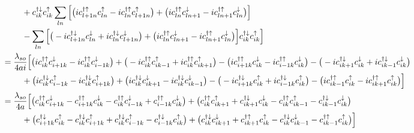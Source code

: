 \documentclass[10pt,prb,showpacs,amssymb,floatfix]{revtex4-1}
\newcommand{\dg}{\dagger}
\newcommand{\dna}{\downarrow}
\newcommand{\nn}{\nonumber}
\newcommand{\upa}{\uparrow}
\begin{document}
\begin{align}
& ~~~~~~~ + c_{ik}^{\dg\dna} c_{ik}^{\upa}  \sum_{ln}  \Big{[} \big{(}i c_{l+1n}^{\dagger \uparrow} c_{l n}^\uparrow - i c_{l n}^{\dagger \uparrow} c_{l+1 n}^\uparrow   \big{)} +  \big{(} i c_{l n}^{\dagger \upa}  c_{l n+1}^\dna  - i c_{ln+1}^{\dagger \uparrow}  c_{ln}^\downarrow \big{)}  \Big{]} \nn\\
& ~~~~~~~  - \sum_{ln}  \Big{[} \big{(} - i c_{l+1n}^{\dagger \downarrow} c_{ln}^\downarrow  + i c_{ln}^{\dagger \downarrow} c_{l+1n}^\downarrow \big{)} +  \big{(} i c_{l n}^{\dagger \upa}  c_{l n+1}^\dna  - i c_{ln+1}^{\dagger \uparrow}  c_{ln}^\downarrow \big{)}  \Big{]} c_{ik}^{\dg\dna} c_{ik}^{\upa}   \Big{]} \nn\\
&= \frac{\lambda_{so}}{4ai} \Big{[}       \big{(}   i c_{ik}^{\dg\upa} c_{i+1k}^\downarrow  - i c_{ik}^{\dg\upa}  c_{i-1 k}^\downarrow \big{)} +  \big{(} -i   c_{ik}^{\dg\upa} c_{i k-1}^\uparrow  + i c_{ik}^{\dg\upa}  c_{i k+1}^\upa \big{)} 
 -  \big{(}i c_{i+1k}^{\dagger \uparrow} c_{i k}^\dna - i c_{i-1 k}^{\dagger \uparrow} c_{i k}^\dna   \big{)} -  \big{(} -i c_{i k+1}^{\dagger \downarrow} c_{i k}^\dna  + i c_{i k-1}^{\dagger \dna}  c_{ik}^\dna  \big{)}  \nn\\
& ~~~~~~~ +   \big{(}i c_{ik}^{\dg\dna}  c_{i-1 k}^\uparrow - i c_{ik}^{\dg\dna} c_{i+1 k}^\uparrow   \big{)} +  \big{(} i c_{ik}^{\dg\dna} c_{i k+1}^\dna  - i  c_{ik}^{\dg\dna} c_{ik-1}^\downarrow \big{)}   -  \big{(} - i c_{i+1k}^{\dagger \downarrow} c_{ik}^\upa  + i c_{i-1 k}^{\dagger \downarrow} c_{ik}^\upa \big{)} -  \big{(} i c_{i k-1}^{\dagger \upa}  c_{ik}^\upa  - i c_{ik+1}^{\dagger \uparrow}  c_{ik}^\upa \big{)}  \Big{]}  \nn\\
&=  \frac{\lambda_{so}}{4a} \Big{[}       \big{(}    c_{ik}^{\dg\upa} c_{i+1k}^\downarrow -  c_{i+1k}^{\dagger \uparrow} c_{i k}^\dna  -  c_{ik}^{\dg\upa}  c_{i-1 k}^\downarrow  +  c_{i-1 k}^{\dagger \uparrow} c_{i k}^\dna   \big{)} 
+  \big{(}   c_{ik}^{\dg\upa}  c_{i k+1}^\upa  + c_{i k+1}^{\dagger \downarrow} c_{i k}^\dna -  c_{ik}^{\dg\upa} c_{i k-1}^\uparrow   -  c_{i k-1}^{\dagger \dna}  c_{ik}^\dna  \big{)}  \nn\\
& ~~~~~~~ +   \big{(}      c_{i+1k}^{\dagger \downarrow} c_{ik}^\upa  -  c_{ik}^{\dg\dna} c_{i+1 k}^\uparrow +   c_{ik}^{\dg\dna}  c_{i-1 k}^\uparrow -  c_{i-1 k}^{\dagger \downarrow} c_{ik}^\upa \big{)} 
+  \big{(}  c_{ik}^{\dg\dna} c_{i k+1}^\dna +  c_{ik+1}^{\dagger \uparrow}  c_{ik}^\upa  -   c_{ik}^{\dg\dna} c_{ik-1}^\downarrow    -    c_{i k-1}^{\dagger \upa}  c_{ik}^\upa  \big{)}  \Big{]} \nn\\

\end{align}
\end{document}
